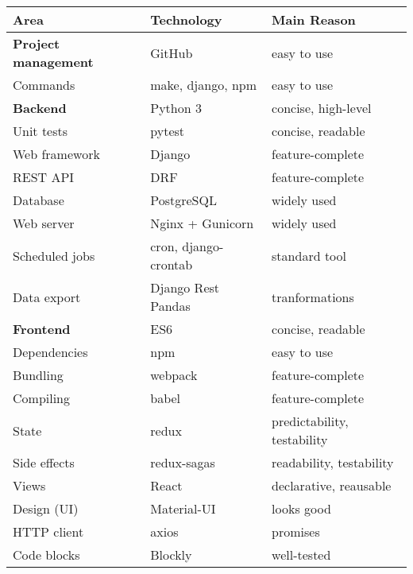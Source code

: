 \begin{center}
\begin{tabular}{l l l}
\toprule
Area & Technology & Main Reason  \\
\midrule
\textbf{Project management} & GitHub & easy to use \\  %
Commands & make, django, npm & easy to use \\
\hline
\textbf{Backend} & Python 3 & concise, high-level \\
Unit tests & pytest & concise, readable \\
Web framework & Django & feature-complete \\ %
REST API & DRF & feature-complete \\ %
Database & PostgreSQL & widely used \\
Web server & Nginx + Gunicorn & widely used \\
Scheduled jobs & cron, django-crontab & standard tool \\
Data export & Django Rest Pandas & tranformations \\ %
\hline
\textbf{Frontend} & ES6 & concise, readable \\
Dependencies & npm & easy to use \\
Bundling & webpack & feature-complete \\ %
Compiling & babel & feature-complete \\ %
State & redux  & predictability, testability \\  %
Side effects & redux-sagas  & readability, testability \\
Views & React & declarative, reausable \\
Design (UI) & Material-UI & looks good \\
HTTP client & axios & promises \\
Code blocks & Blockly & well-tested \\

\end{tabular}
\end{center}
